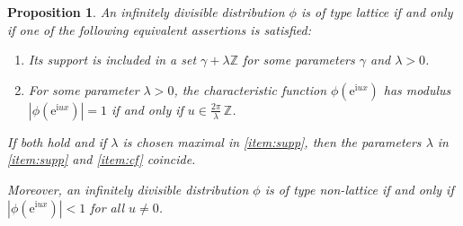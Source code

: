 \documentclass[12pt,a4paper,reqno]{amsart}
\newtheorem{proposition}[lemma]{Proposition}
\theoremstyle{remark}
\newcommand{\Z}{\mathbb{Z}}
\newcommand{\E}{\mathrm{e}}
\newcommand{\I}{\mathrm{i}}
\begin{document}
\begin{proposition}\label{prop:latticeandnonlattice}
An infinitely divisible distribution $\phi$ is of type lattice if and only if one of the following equivalent assertions is satisfied:\vspace{2mm}
\begin{enumerate}
    \item \label{item:supp} Its support is included in a set $\gamma+\lambda \Z$ for some parameters $\gamma$ and $\lambda> 0$. \vspace{2mm}
    \item \label{item:cf} For some parameter $\lambda> 0$, the characteristic function $\phi(\E^{\I u x})$ has modulus $|\phi(\E^{\I u x})|=1$ if and only if $u \in \frac{2\pi}{\lambda}\,\Z$.\vspace{2mm}
\end{enumerate}
If both hold and if $\lambda$ is chosen maximal in \eqref{item:supp}, then the parameters $\lambda$ in \eqref{item:supp} and \eqref{item:cf} coincide.
\medskip

\noindent Moreover, an infinitely divisible distribution $\phi$ is of type non-lattice if and only if $|\phi(\E^{\I u x})|<1$ for all $u \neq 0$.
\end{proposition}
\end{document}
